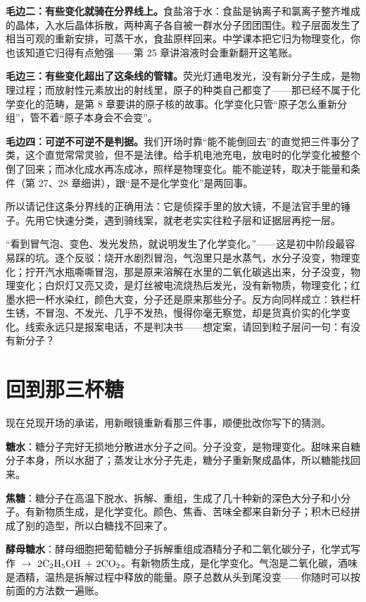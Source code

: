 \textbf{毛边二：有些变化就骑在分界线上。}食盐溶于水：食盐是钠离子和氯离子整齐堆成的晶体，入水后晶体拆散，两种离子各自被一群水分子团团围住。粒子层面发生了相当可观的重新安排，可蒸干水，食盐原样回来。中学课本把它归为物理变化，你也该知道它归得有点勉强——第 25 章讲溶液时会重新翻开这笔账。

\textbf{毛边三：有些变化超出了这条线的管辖。}荧光灯通电发光，没有新分子生成，是物理过程；而放射性元素放出的射线里，原子的种类自己都变了——那已经不属于化学变化的范畴，是第 8 章要讲的原子核的故事。化学变化只管“原子怎么重新分组”，管不着“原子本身会不会变”。

\textbf{毛边四：可逆不可逆不是判据。}我们开场时靠“能不能倒回去”的直觉把三件事分了类，这个直觉常常灵验，但不是法律。给手机电池充电，放电时的化学变化被整个倒了回来；而冰化成水再冻成冰，照样是物理变化。能不能逆转，取决于能量和条件（第 27、28 章细讲），跟“是不是化学变化”是两回事。

所以请记住这条分界线的正确用法：它是侦探手里的放大镜，不是法官手里的锤子。先用它快速分类，遇到骑线案，就老老实实往粒子层和证据层再挖一层。

\begin{wuqu}
“看到冒气泡、变色、发光发热，就说明发生了化学变化。”——这是初中阶段最容易踩的坑。逐个反驳：烧开水剧烈冒泡，气泡里只是水蒸气，水分子没变，物理变化；拧开汽水瓶嘶嘶冒泡，那是原来溶解在水里的二氧化碳逃出来，分子没变，物理变化；白炽灯又亮又烫，是灯丝被电流烧热后发光，没有新物质，物理变化；红墨水把一杯水染红，颜色大变，分子还是原来那些分子。反方向同样成立：铁栏杆生锈，不冒泡、不发光、几乎不发热，慢得你毫无察觉，却是货真价实的化学变化。线索永远只是报案电话，不是判决书——想定案，请回到粒子层问一句：有没有新分子？
\end{wuqu}

\section{回到那三杯糖}

现在兑现开场的承诺，用新眼镜重新看那三件事，顺便批改你写下的猜测。

\textbf{糖水}：糖分子完好无损地分散进水分子之间。分子没变，是物理变化。甜味来自糖分子本身，所以水甜了；蒸发让水分子先走，糖分子重新聚成晶体，所以糖能找回来。

\textbf{焦糖}：糖分子在高温下脱水、拆解、重组，生成了几十种新的深色大分子和小分子。有新物质生成，是化学变化。颜色、焦香、苦味全都来自新分子；积木已经拼成了别的造型，所以白糖找不回来了。

\textbf{酵母糖水}：酵母细胞把葡萄糖分子拆解重组成酒精分子和二氧化碳分子，化学式写作  $\rightarrow$ $2\mathrm{C_2H_5OH}$ $+$ $2\mathrm{CO_2}$。有新物质生成，是化学变化。气泡是二氧化碳，酒味是酒精，温热是拆解过程中释放的能量。原子总数从头到尾没变——你随时可以按前面的方法数一遍账。

